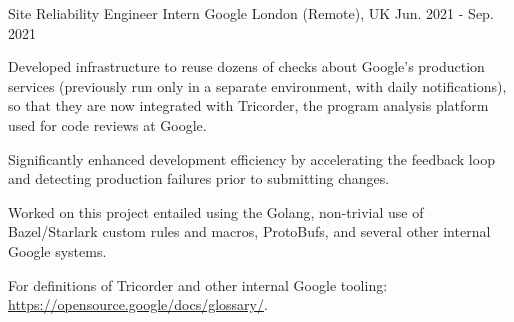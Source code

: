 

\begin{cventries}

  \cventry
    {Site Reliability Engineer Intern} %
    {Google} %
    {London (Remote), UK} %
    {Jun. 2021 - Sep. 2021} %
    {
      \begin{cvitems} %
        \item {Developed infrastructure to reuse dozens of checks about Google’s production services (previously run only in a separate environment, with daily notifications), so that they are now integrated with Tricorder, the program analysis platform used for code reviews at Google.}
        \item {Significantly enhanced development efficiency by accelerating the feedback loop and detecting production failures prior to submitting changes.}
        \item {Worked on this project entailed using the Golang, non-trivial use of Bazel/Starlark custom rules and macros, ProtoBufs, and several other internal Google systems.}
        \item {For definitions of Tricorder and other internal Google tooling: \href{https://opensource.google/docs/glossary/}{https://opensource.google/docs/glossary/}.}
      \end{cvitems}
    }


\end{cventries}
